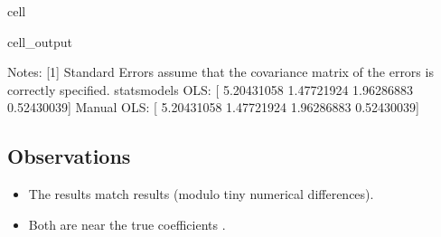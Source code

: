 \documentclass[letterpaper,10pt,english]{jupyterBook}
\begin{document}
\begin{sphinxuseclass}{cell}
\begin{sphinxVerbatimOutput}
\begin{sphinxuseclass}{cell_output}
\begin{sphinxVerbatim}[commandchars=\\\{\}]
Notes:
[1] Standard Errors assume that the covariance matrix of the errors is correctly specified.
statsmodels OLS: [ 5.20431058  1.47721924 \PYGZhy{}1.96286883  0.52430039]
Manual OLS: [ 5.20431058  1.47721924 \PYGZhy{}1.96286883  0.52430039]
\end{sphinxVerbatim}

\end{sphinxuseclass}\end{sphinxVerbatimOutput}

\end{sphinxuseclass}

\subsection{Observations}
\label{\detokenize{02:observations}}\begin{itemize}
\item {} 
\sphinxAtStartPar
The  results match  results (modulo tiny numerical differences).

\item {} 
\sphinxAtStartPar
Both are near the true coefficients .

\end{itemize}
\end{document}
